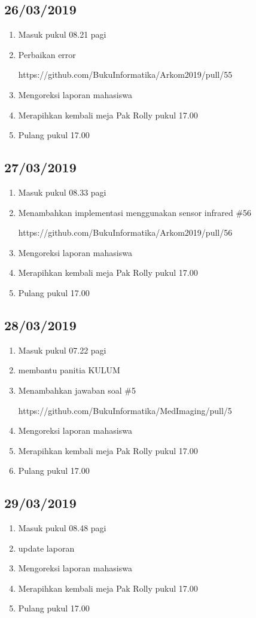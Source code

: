 \subsection{26/03/2019}
\begin{enumerate}
  \item Masuk pukul 08.21 pagi
  \item Perbaikan error
\par https://github.com/BukuInformatika/Arkom2019/pull/55
  \item Mengoreksi laporan mahasiswa
 \item Merapihkan kembali meja Pak Rolly pukul 17.00
  \item Pulang pukul 17.00 
\end{enumerate}

\subsection{27/03/2019}
\begin{enumerate}
  \item Masuk pukul 08.33 pagi
  \item Menambahkan implementasi menggunakan sensor infrared \#56
\par https://github.com/BukuInformatika/Arkom2019/pull/56
  \item Mengoreksi laporan mahasiswa
 \item Merapihkan kembali meja Pak Rolly pukul 17.00
  \item Pulang pukul 17.00 
\end{enumerate}

\subsection{28/03/2019}
\begin{enumerate}
  \item Masuk pukul 07.22 pagi
 \item membantu panitia KULUM
  \item Menambahkan jawaban soal \#5
\par https://github.com/BukuInformatika/MedImaging/pull/5
  \item Mengoreksi laporan mahasiswa
 \item Merapihkan kembali meja Pak Rolly pukul 17.00
  \item Pulang pukul 17.00 
\end{enumerate}

\subsection{29/03/2019}
\begin{enumerate}
  \item Masuk pukul 08.48 pagi
  \item update laporan
  \item Mengoreksi laporan mahasiswa
 \item Merapihkan kembali meja Pak Rolly pukul 17.00
  \item Pulang pukul 17.00 
\end{enumerate}

